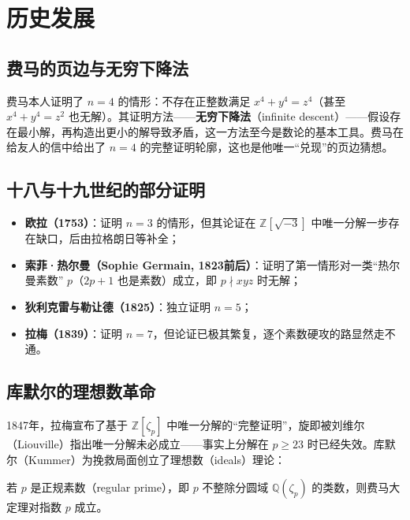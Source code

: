 \section{历史发展}\label{sec:history}

\subsection{费马的页边与无穷下降法}

费马本人证明了 $n = 4$ 的情形：不存在正整数满足 $x^4 + y^4 = z^4$（甚至 $x^4 + y^4 = z^2$ 也无解）。其证明方法——\textbf{无穷下降法}（infinite descent）——假设存在最小解，再构造出更小的解导致矛盾，这一方法至今是数论的基本工具。费马在给友人的信中给出了 $n=4$ 的完整证明轮廓，这也是他唯一“兑现”的页边猜想。

\subsection{十八与十九世纪的部分证明}

\begin{itemize}
    \item \textbf{欧拉（1753）}：证明 $n=3$ 的情形\cite{euler1770algebra}，但其论证在 $\mathbb{Z}[\sqrt{-3}]$ 中唯一分解一步存在缺口，后由拉格朗日等补全；
    \item \textbf{索菲·热尔曼（Sophie Germain, 1823前后）}：证明了第一情形对一类“热尔曼素数” $p$（$2p+1$ 也是素数）成立，即 $p \nmid xyz$ 时无解；
    \item \textbf{狄利克雷与勒让德（1825）}：独立证明 $n=5$；
    \item \textbf{拉梅（1839）}：证明 $n=7$，但论证已极其繁复，逐个素数硬攻的路显然走不通。
\end{itemize}

\subsection{库默尔的理想数革命}

1847年，拉梅宣布了基于 $\mathbb{Z}[\zeta_p]$ 中唯一分解的“完整证明”，旋即被刘维尔（Liouville）指出唯一分解未必成立——事实上分解在 $p \ge 23$ 时已经失效。库默尔（Kummer）为挽救局面创立了理想数（ideals）理论\cite{kummer1847decomposition}：

\begin{theorem}[库默尔，1847]
    若 $p$ 是正规素数（regular prime），即 $p$ 不整除分圆域 $\mathbb{Q}(\zeta_p)$ 的类数，则费马大定理对指数 $p$ 成立。
\end{theorem}

